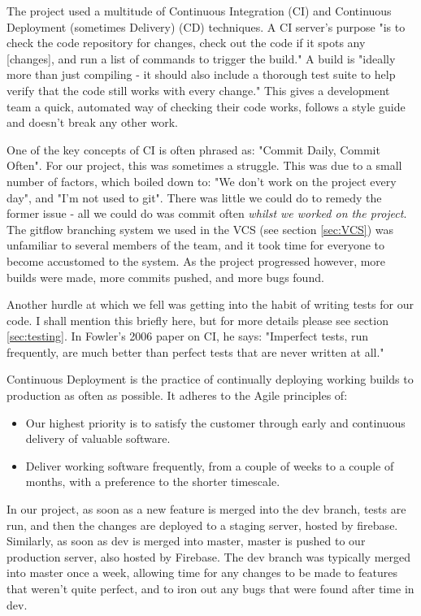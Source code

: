 \documentclass{l3proj}
\begin{document}
The project used a multitude of Continuous Integration (CI) and Continuous
 Deployment (sometimes Delivery) (CD) techniques. A CI server's purpose "is to check the code
 repository for changes, check out the code if it spots any [changes], and run a
 list of commands to trigger the build."\cite{meyer2014continuous} A build is "ideally more than just
 compiling - it should also include a thorough test suite to help verify that the code
 still works with every change."\cite{meyer2014continuous} This gives a development
 team a quick, automated way of checking their code works, follows a style guide and
 doesn't break any other work.

One of the key concepts of CI is often phrased as: "Commit Daily,
 Commit Often"\cite{meyer2014continuous}. For our project, this was sometimes a struggle.
 This was due to a small number of factors, which boiled down to: "We don't work on the project
 every day", and "I'm not used to git". There was little we could do to remedy the former issue -
 all we could do was commit often \textit{whilst we worked on the project}. The gitflow
 branching system we used in the VCS (see section \ref{sec:VCS}) was unfamiliar to several
 members of the team, and it took time for everyone to become accustomed to the system. As the
 project progressed however, more builds were made, more commits pushed, and more bugs found.

Another hurdle at which we fell was getting into the habit of writing tests for our code. I shall
 mention this briefly here, but for more details please see section \ref{sec:testing}. In Fowler's
 2006 paper on CI, he says: "Imperfect tests, run frequently, are much better than perfect tests
 that are never written at all."\cite{fowler2006continuous}

Continuous Deployment is the practice of continually deploying working builds to production
 as often as possible. It adheres to the Agile principles of:
 \begin{itemize}
 \item
 Our highest priority is to satisfy the customer
 through early and continuous delivery
 of valuable software. \cite{agileprinciples}
 \item
 Deliver working software frequently, from a
 couple of weeks to a couple of months, with a
 preference to the shorter timescale. \cite{agileprinciples}
 \end{itemize}
 In our project, as soon as a new feature is merged into the dev branch,
 tests are run, and then the changes are deployed to a staging server, hosted by firebase. Similarly,
 as soon as dev is merged into master, master is pushed to our production server, also hosted by Firebase.
 The dev branch was typically merged into master once a week, allowing time for any changes to be made
 to features that weren't quite perfect, and to iron out any bugs that were found after time in dev.
\end{document}
